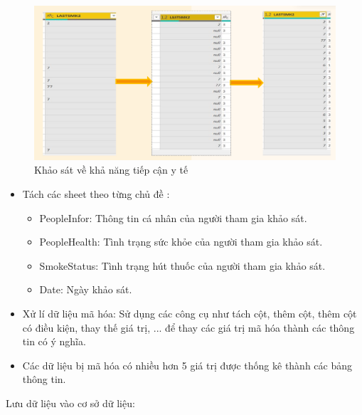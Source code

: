            \begin{figure}[!h]
                \begin{center}
                \includegraphics[scale = 0.8]{HONG/1.png}
              \caption{Khảo sát về khả năng tiếp cận y tế}
         
\end{center}
   \end{figure}
\begin{itemize}
\item Tách các sheet theo từng chủ đề :

\begin{itemize}
    \item PeopleInfor: Thông tin cá nhân của người tham gia khảo sát.
    \item PeopleHealth: Tình trạng sức khỏe của người tham gia khảo sát.
\item SmokeStatus: Tình trạng hút thuốc của người tham gia khảo sát.
\item Date: Ngày khảo sát.
\end{itemize} 
\item Xử lí dữ liệu mã hóa: Sử dụng các công cụ như tách cột, thêm cột, thêm cột có
điều kiện, thay thế giá trị, ... để thay các giá trị mã hóa thành các thông tin có ý
nghĩa.
\item Các dữ liệu bị mã hóa có nhiều hơn 5 giá trị được thống kê thành các bảng thông
tin.
\end{itemize}
Lưu dữ liệu vào cơ sở dữ liệu:

